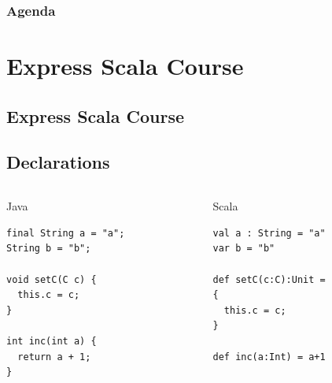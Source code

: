 \documentclass[14pt]{beamer}
\def\colored#1{\textcolor{myOrange}{#1}}
\begin{document}
\frame%
{\frametitle{Agenda}
  \tableofcontents[1]
}

\section{Express Scala Course}
\subsection{Express Scala Course}


\subsection{Declarations}
\begin{frame}[t,fragile]
  \begin{columns}
    \begin{column}[t]{0.45\textwidth}
\centering \Large \colored{Java} \\
    \begin{center}
\begin{lstlisting}[frame=single]
final String a = "a";
String b = "b";

void setC(C c) {
  this.c = c;
}

int inc(int a) {
  return a + 1;
}

\end{lstlisting} 
    \end{center}
    \end{column}
    \begin{column}[t]{0.45\textwidth}
\centering \Large \colored{Scala} \\
    \pause
    \begin{center}
\begin{lstlisting}[frame=single]
val a : String = "a"
var b = "b"

def setC(c:C):Unit = 
{
  this.c = c;
}

def inc(a:Int) = a+1
\end{lstlisting}
    \end{center}

    \end{column}
  \end{columns}
\end{frame}
\end{document}
